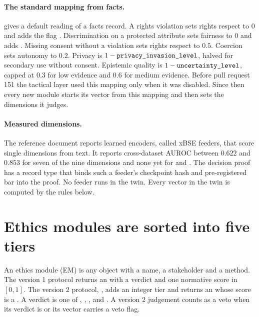 \paragraph{The standard mapping from facts.}  gives a
default reading of a facts record. A rights violation sets rights respect to $0$ and adds the
flag . Discrimination on a protected attribute sets fairness to $0$ and
adds . Missing consent without a violation sets rights respect to $0.5$.
Coercion sets autonomy to $0.2$. Privacy is $1 - \texttt{privacy\_invasion\_level}$, halved for
secondary use without consent. Epistemic quality is $1 - \texttt{uncertainty\_level}$, capped at
$0.3$ for low evidence and $0.6$ for medium evidence. Before pull request 151 the tactical layer
used this mapping only when it was disabled. Since then every new module starts
its vector from this mapping and then sets the dimensions it judges.

\paragraph{Measured dimensions.} The reference document reports learned encoders, called xBSE
feeders, that score single dimensions from text. It reports cross-dataset AUROC between $0.622$
and $0.853$ for seven of the nine dimensions and none yet for  and
. The decision proof has a record type that binds such a feeder's
checkpoint hash and pre-registered bar into the proof. No feeder runs in the twin. Every vector
in the twin is computed by the rules below.

\section{Ethics modules are sorted into five tiers}\label{sec:deme-modules}

An ethics module (EM) is any object with a name, a stakeholder and a  method. The
version 1 protocol returns an  with a verdict and one normative score in
$[0,1]$. The version 2 protocol, , adds an integer tier and returns an
 whose score is a . A verdict is one of
, , ,  and . A
version 2 judgement counts as a veto when its verdict is  or its vector carries a
veto flag.

